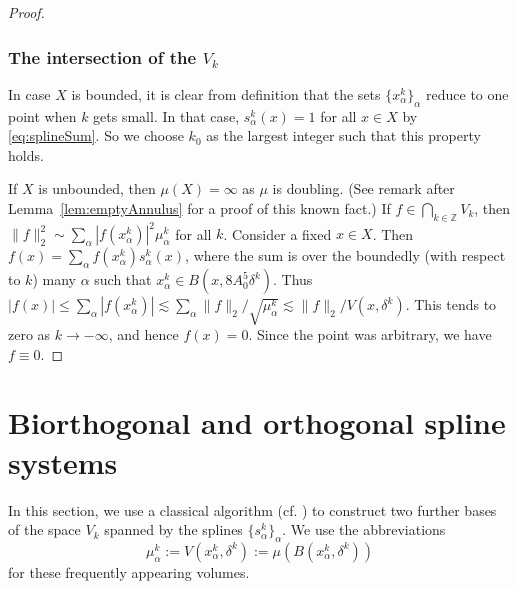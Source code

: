 \documentclass{amsart}
\numberwithin{equation}{section}
\theoremstyle{plain}
\theoremstyle{definition}
\theoremstyle{remark}
\begin{document}
{{\begin{proof}
\subsubsection*{The intersection of the $V_k$}
In case $X$ is bounded, it is clear from definition that the sets $\{x^k_{\alpha}\}_{\alpha}$ reduce to one point when $k$ gets small. In that case, $s^k_{\alpha}(x)=1$ for all $x\in X$ by \eqref{eq:splineSum}. So we choose $k_{0}$ as the largest 
integer  such that this property holds.
 
If $X$ is unbounded,  then $\mu(X)=\infty$ as $\mu$ is doubling. (See remark after Lemma~\ref{lem:emptyAnnulus} for a proof of this known fact.) If $f \in  \bigcap_{k\in {\mathbb{Z}}} V_{k}$, then 
 $\|f\|_{2}^2 \sim  \sum_{\alpha} |f(x^k_{\alpha})|^2\mu^k_{\alpha}$  for all $k$.
 Consider a fixed $x\in X$. Then $f(x)=\sum_\alpha f(x^k_\alpha)s^k_\alpha(x)$, where the sum is over the boundedly (with respect to $k$) many $\alpha$ such that $x^k_\alpha\in B(x,8A_0^5\delta^k)$. Thus ${|{f(x)}|}\leq\sum_\alpha{|{f(x^k_\alpha)}|}\lesssim\sum_\alpha{\|{f}\|_{{2}}}/\sqrt{\mu^k_\alpha}\lesssim{\|{f}\|_{{2}}}/V(x,\delta^k)$. This tends to zero as $k\to-\infty$, and hence $f(x)=0$. Since the point was arbitrary, we have $f\equiv 0$.
 \end{proof}

\section{Biorthogonal and orthogonal spline systems}\label{sect:biortho}

In this section, we use a classical algorithm (cf. \cite[Sec.~2.3]{M2}) to construct two further bases of the space $V_k$ spanned by the splines $\{s^k_\alpha\}_\alpha$. We use the abbreviations
\begin{equation*}
  \mu^k_\alpha:=V(x^k_\alpha,\delta^k):=\mu(B(x^k_\alpha,\delta^k))
\end{equation*}
for these frequently appearing volumes.

}}
\end{document}
